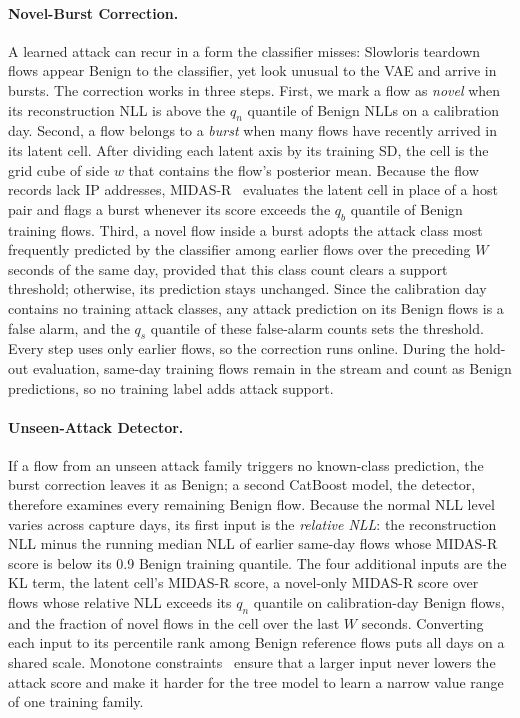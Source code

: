 \documentclass[runningheads,a4paper]{llncs}
\begin{document}
\paragraph{Novel-Burst Correction.}
A learned attack can recur in a form the classifier misses: Slowloris teardown flows appear Benign to the classifier, yet look unusual to the VAE and arrive in bursts. The correction works in three steps. First, we mark a flow as \emph{novel} when its reconstruction NLL is above the $q_n$ quantile of Benign NLLs on a calibration day. Second, a flow belongs to a \emph{burst} when many flows have recently arrived in its latent cell. After dividing each latent axis by its training SD, the cell is the grid cube of side $w$ that contains the flow's posterior mean. Because the flow records lack IP addresses, MIDAS-R~\cite{bhatia2020} evaluates the latent cell in place of a host pair and flags a burst whenever its score exceeds the $q_b$ quantile of Benign training flows. Third, a novel flow inside a burst adopts the attack class most frequently predicted by the classifier among earlier flows over the preceding $W$ seconds of the same day, provided that this class count clears a support threshold; otherwise, its prediction stays unchanged. Since the calibration day contains no training attack classes, any attack prediction on its Benign flows is a false alarm, and the $q_s$ quantile of these false-alarm counts sets the threshold. Every step uses only earlier flows, so the correction runs online. During the hold-out evaluation, same-day training flows remain in the stream and count as Benign predictions, so no training label adds attack support.

\paragraph{Unseen-Attack Detector.}
If a flow from an unseen attack family triggers no known-class prediction, the burst correction leaves it as Benign; a second CatBoost model, the detector, therefore examines every remaining Benign flow. Because the normal NLL level varies across capture days, its first input is the \emph{relative NLL}: the reconstruction NLL minus the running median NLL of earlier same-day flows whose MIDAS-R score is below its 0.9 Benign training quantile. The four additional inputs are the KL term, the latent cell's MIDAS-R score, a novel-only MIDAS-R score over flows whose relative NLL exceeds its $q_n$ quantile on calibration-day Benign flows, and the fraction of novel flows in the cell over the last $W$ seconds. Converting each input to its percentile rank among Benign reference flows puts all days on a shared scale. Monotone constraints~\cite{incer2018} ensure that a larger input never lowers the attack score and make it harder for the tree model to learn a narrow value range of one training family.
\end{document}
